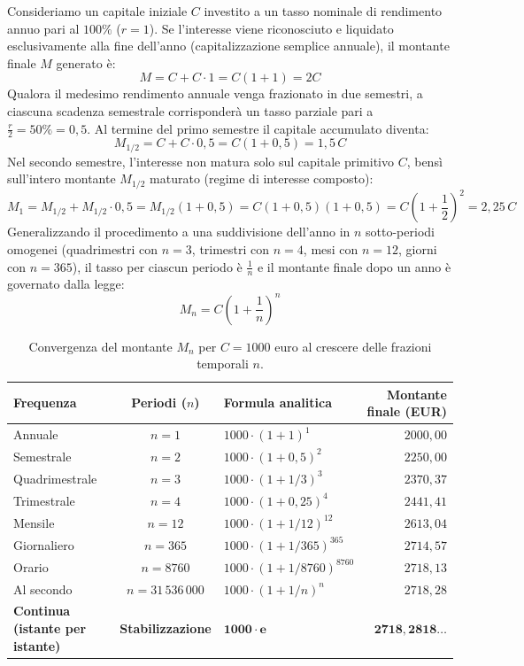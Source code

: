 \documentclass[11pt,a4paper,oneside]{report}
\begin{document}
Consideriamo un capitale iniziale $C$ investito a un tasso nominale di rendimento annuo pari al $100\%$ ($r = 1$). Se l'interesse viene riconosciuto e liquidato esclusivamente alla fine dell'anno (capitalizzazione semplice annuale), il montante finale $M$ generato è:
\begin{equation}
    M = C + C \cdot 1 = C(1 + 1) = 2C
\end{equation}
Qualora il medesimo rendimento annuale venga frazionato in due semestri, a ciascuna scadenza semestrale corrisponderà un tasso parziale pari a $\frac{r}{2} = 50\% = 0{,}5$. Al termine del primo semestre il capitale accumulato diventa:
\begin{equation}
    M_{1/2} = C + C \cdot 0{,}5 = C(1 + 0{,}5) = 1{,}5 \, C
\end{equation}
Nel secondo semestre, l'interesse non matura solo sul capitale primitivo $C$, bensì sull'intero montante $M_{1/2}$ maturato (regime di interesse composto):
\begin{equation}
    M_1 = M_{1/2} + M_{1/2} \cdot 0{,}5 = M_{1/2}(1 + 0{,}5) = C(1 + 0{,}5)(1 + 0{,}5) = C\left(1 + \frac{1}{2}\right)^2 = 2{,}25 \, C
\end{equation}
Generalizzando il procedimento a una suddivisione dell'anno in $n$ sotto-periodi omogenei (quadrimestri con $n=3$, trimestri con $n=4$, mesi con $n=12$, giorni con $n=365$), il tasso per ciascun periodo è $\frac{1}{n}$ e il montante finale dopo un anno è governato dalla legge:
\begin{equation}
    M_n = C\left(1 + \frac{1}{n}\right)^n
\end{equation}

\begin{table}[htbp]
\centering
\small
\caption{Convergenza del montante $M_n$ per $C = 1000\text{ euro}$ al crescere delle frazioni temporali $n$.}
\label{tab:bernoulli}
\begin{tabularx}{\textwidth}{l c >{\centering\arraybackslash}X r}
\toprule
\textbf{Frequenza} & \textbf{Periodi ($n$)} & \textbf{Formula analitica} & \textbf{Montante finale (EUR)} \\
\midrule
Annuale & $n = 1$ & $1000 \cdot (1 + 1)^1$ & $2000{,}00$ \\
Semestrale & $n = 2$ & $1000 \cdot (1 + 0{,}5)^2$ & $2250{,}00$ \\
Quadrimestrale & $n = 3$ & $1000 \cdot (1 + 1/3)^3$ & $2370{,}37$ \\
Trimestrale & $n = 4$ & $1000 \cdot (1 + 0{,}25)^4$ & $2441{,}41$ \\
Mensile & $n = 12$ & $1000 \cdot (1 + 1/12)^{12}$ & $2613{,}04$ \\
Giornaliero & $n = 365$ & $1000 \cdot (1 + 1/365)^{365}$ & $2714{,}57$ \\
Orario & $n = 8760$ & $1000 \cdot (1 + 1/8760)^{8760}$ & $2718{,}13$ \\
Al secondo & $n = 31\,536\,000$ & $1000 \cdot (1 + 1/n)^n$ & $2718{,}28$ \\
\textbf{Continua (istante per istante)} & \textbf{Stabilizzazione} & $\mathbf{1000 \cdot e}$ & $\mathbf{2718{,}2818\dots}$ \\
\bottomrule
\end{tabularx}
\end{table}
\end{document}
